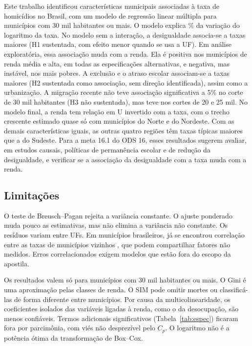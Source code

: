 \documentclass[a4paper,11pt]{article}
\begin{document}
Este trabalho identificou características municipais associadas à taxa de homicídios no Brasil, com um modelo de regressão linear múltipla para \nMunEsc{} municípios com 30 mil habitantes ou mais. O modelo explica \nRdoisPct\% da variação do logaritmo da taxa. No modelo sem a interação, a desigualdade associa-se a taxas maiores (H1 sustentada, com efeito menor quando se usa a UF). Em análise exploratória, essa associação muda com a renda. Ela é positiva nos municípios de renda média e alta, em todas as especificações alternativas, e negativa, mas instável, nos mais pobres. A exclusão e o atraso escolar associam-se a taxas maiores (H2 sustentada como associação, sem direção identificada), assim como a urbanização. A migração recente não teve associação significativa a 5\% no corte de 30 mil habitantes (H3 não sustentada), mas teve nos cortes de 20 e 25 mil. No modelo final, a renda tem relação em U invertido com a taxa, com o trecho crescente estimado quase só com municípios do Norte e do Nordeste. Com as demais características iguais, as outras quatro regiões têm taxas típicas maiores que a do Sudeste. Para a meta 16.1 do ODS 16, esses resultados sugerem avaliar, em estudos causais, políticas de permanência escolar e de redução da desigualdade, e verificar se a associação da desigualdade com a taxa muda com a renda.



\subsection{Limitações}
\label{sec:lim}

O teste de Breusch--Pagan rejeita a variância constante. O ajuste ponderado muda pouco as estimativas, mas não elimina a variância não constante. Os resíduos variam entre UFs. Em municípios brasileiros, já se encontrou correlação entre as taxas de municípios vizinhos \citep{carvalho2015}, que podem compartilhar fatores não medidos. Erros correlacionados exigem modelos que estão fora do escopo da apostila.

Os resultados valem só para municípios com 30 mil habitantes ou mais. O Gini é uma aproximação pelas classes de renda. O SIM pode omitir mortes ou classificá-las de forma diferente entre municípios. Por causa da multicolinearidade, os coeficientes isolados das variáveis ligadas à renda, como o da desocupação, são menos confiáveis. Termos adicionais significativos (Tabela~\ref{tab:espec}) ficaram fora por parcimônia, com viés não desprezível pelo $C_p$. O logaritmo não é a potência ótima da transformação de Box--Cox.
\end{document}

